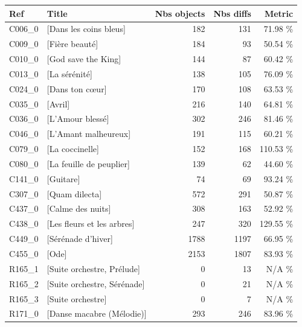 \begin{small}
\begin{tabular}{l|l|r|r|r}
\textbf{Ref} & \textbf{Title} & \textbf{Nbs objects} &  \textbf{Nbs diffs} & \textbf{Metric} \\ \hline
	C006\_0 & [Dans les coins bleus]  & 182 & 131 & 71.98 \% \\ 
		C009\_0 & [Fière beauté]  & 184 & 93 & 50.54 \% \\ 
		C010\_0 & [God save the King] & 144 & 87 & 60.42 \% \\ 
		C013\_0 & [La sérénité]  & 138 & 105 & 76.09 \% \\ 
		C024\_0 & [Dans ton cœur] & 170 & 108 & 63.53 \% \\ 
		C035\_0 & [Avril] & 216 & 140 & 64.81 \% \\ 
		C036\_0 & [L'Amour blessé] & 302 & 246 & 81.46 \% \\ 
		C046\_0 & [L'Amant malheureux] & 191 & 115 & 60.21 \% \\ 
		C079\_0 & [La coccinelle]  & 152 & 168 & 110.53 \% \\ 
		C080\_0 & [La feuille de peuplier] & 139 & 62 & 44.60 \% \\ 
		C141\_0 & [Guitare]  & 74 & 69 & 93.24 \% \\ 
		C307\_0 & [Quam dilecta] & 572 & 291 & 50.87 \% \\ 
		C437\_0 & [Calme des nuits] & 308 & 163 & 52.92 \% \\ 
		C438\_0 & [Les fleurs et les arbres] & 247 & 320 & 129.55 \% \\ 
		C449\_0 & [Sérénade d'hiver]  & 1788 & 1197 & 66.95 \% \\ 
		C455\_0 & [Ode]  & 2153 & 1807 & 83.93 \% \\ 
		R165\_1 & [Suite orchestre, Prélude] & 0 & 13 & N/A \% \\ 
		R165\_2 & [Suite orchestre, Sérénade] & 0 & 21 & N/A \% \\ 
		R165\_3 & [Suite orchestre] & 0 & 7 & N/A \% \\ 
		R171\_0 & [Danse macabre (Mélodie)]  & 293 & 246 & 83.96 \% \\ 
		\hline
\end{tabular}
\end{small}
	